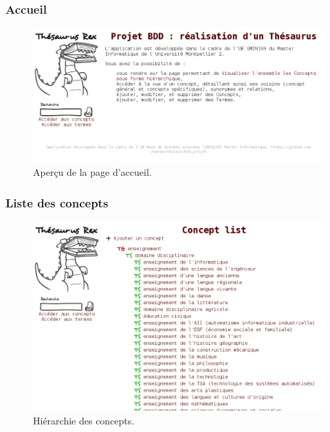 \subsubsection{Accueil}
\begin{figure}[H]
\begin{center}
\includegraphics[width=\textwidth]{files/screen_accueil}
\end{center}
\caption{Aperçu de la page d'accueil.}
\end{figure}

\subsubsection{Liste des concepts}
\begin{figure}[H]
\begin{center}
\includegraphics[width=\textwidth]{files/screen_concepts}
\end{center}
\caption{Hiérarchie des concepts.}
\end{figure}

